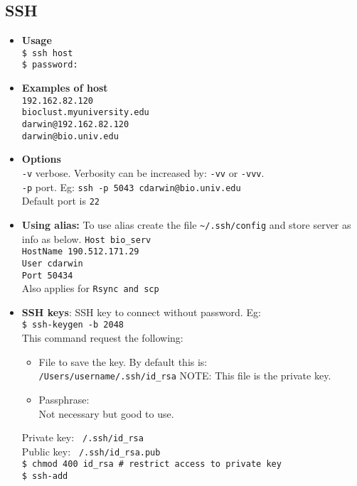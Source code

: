 \vfill \null
\columnbreak

\subsection{SSH}
\begin{itemize}
\item \textbf{Usage}\\
\texttt{\$ ssh host}\\
\texttt{\$ password:}\\

\item \textbf{Examples of host}\\
\texttt{192.162.82.120}\\
\texttt{bioclust.myuniversity.edu}\\
\texttt{darwin@192.162.82.120}\\
\texttt{darwin@bio.univ.edu}\\

\item \textbf{Options} \\

\texttt{-v} verbose. Verbosity can be increased by: \texttt{-vv} or \texttt{-vvv}. \\
\texttt{-p} port. Eg: \texttt{ssh -p 5043 cdarwin@bio.univ.edu}\\
\qquad Default port is \texttt{22}

 
\item \textbf{Using alias:} To use alias create the file \texttt{\~{}/.ssh/config} and store server as info as below. 
\texttt{Host bio\_serv}\\
\qquad \texttt{HostName 190.512.171.29}\\
\qquad \texttt{User cdarwin}\\
\qquad \texttt{Port 50434}\\
Also applies for \texttt{Rsync and scp}\\

\item \textbf{SSH keys}: SSH key to connect without password. Eg:\\
\texttt{\$ ssh-keygen -b 2048}\\
This command request the following:\\
\begin{itemize}
\item File to save the key. By default this is:\\
\texttt{/Users/username/.ssh/id\_rsa}
NOTE: This file is the private key.\\
\item Passphrase:\\
Not necessary but good to use.\\
\end{itemize}
Private key: \texttt{~/.ssh/id\_rsa}\\
Public key: \texttt{~/.ssh/id\_rsa.pub}\\

\texttt{\$ chmod 400 id\_rsa \# restrict access to private key}\\
\texttt{\$ ssh-add} \\

\end{itemize}


